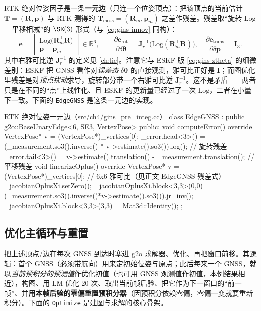 RTK 绝对位姿因子是一条\textbf{一元边}（只连一个位姿顶点）：把该顶点的当前估计 $\mathbf{T}=(\mathbf{R},\mathbf{p})$ 与 RTK 测得的 $\mathbf{T}_{\text{meas}}=(\mathbf{R}_m,\mathbf{p}_m)$ 之差作残差。残差取“旋转 $\mathrm{Log}$ + 平移相减”的 $\SE(3)$ 形式（与 \cref{eq:gins-innov} 同构）：
\begin{equation}
\label{eq:gins-edgegnss}
\mathbf{e} =
\begin{bmatrix}\mathrm{Log}\big(\mathbf{R}_m^\top\mathbf{R}\big)\\[3pt] \mathbf{p}-\mathbf{p}_m\end{bmatrix}\in\mathbb{R}^6,
\qquad
\frac{\partial\mathbf{e}_{\text{rot}}}{\partial\delta\boldsymbol{\theta}}=\mathbf{J}_r^{-1}\big(\mathrm{Log}(\mathbf{R}_m^\top\mathbf{R})\big),\quad
\frac{\partial\mathbf{e}_{\text{trans}}}{\partial\delta\mathbf{p}}=\mathbf{I}_3.
\end{equation}
其中右雅可比逆 $\mathbf{J}_r^{-1}$ 的定义见 \cref{ch:lie}。注意它与 ESKF 版 \cref{eq:gins-ztheta} 的细微差别：ESKF 把 GNSS 看作对\emph{误差态} $\delta\boldsymbol{\theta}$ 的直接观测，雅可比正好是 $\mathbf{I}$；而图优化里残差是对\emph{顶点扰动}求导，旋转部分带一个右雅可比逆 $\mathbf{J}_r^{-1}$。这不是矛盾——两者只是在不同的“点”上线性化、且 ESKF 的更新量已经过了一次 $\mathrm{Log}$，二者在小量下一致。下面的 \texttt{EdgeGNSS} 是这条一元边的实现。

\begin{codebox}[C++]{RTK 绝对位姿一元边（src/ch4/gins\_pre\_integ.cc）}
class EdgeGNSS : public g2o::BaseUnaryEdge<6, SE3, VertexPose> {
public:
  void computeError() override {
    VertexPose* v = (VertexPose*)_vertices[0];
    _error.head<3>() = (_measurement.so3().inverse() * v->estimate().so3()).log();   // 旋转残差
    _error.tail<3>() = v->estimate().translation() - _measurement.translation();     // 平移残差
  }
  void linearizeOplus() override {
    VertexPose* v = (VertexPose*)_vertices[0];      // 6x6 雅可比（见正文 EdgeGNSS 残差式）
    _jacobianOplusXi.setZero();
    _jacobianOplusXi.block<3,3>(0,0) = (_measurement.so3().inverse()*v->estimate().so3()).jr_inv();
    _jacobianOplusXi.block<3,3>(3,3) = Mat3d::Identity();
  }
};
\end{codebox}

\subsection{优化主循环与重置}
\label{sec:gins-optimize}

把上述顶点/边在每次 GNSS 到达时塞进 g2o 求解器、优化、再把窗口前移。其逻辑\cite{gao2023slamad}：首个 GNSS（必须带航向）用来定初始位姿与原点；此后每来一个 GNSS，就以\emph{当前预积分的预测值}作优化初值（也可用 GNSS 观测值作初值，本例结果相近），构图、用 LM 优化 $20$ 次、取出当前帧后验、把它作为下一窗口的“前一帧”、并\textbf{用本帧后验的零偏重置预积分器}（因预积分依赖零偏，零偏一变就要重新积分）。下面的 \texttt{Optimize} 是建图与求解的核心骨架。

